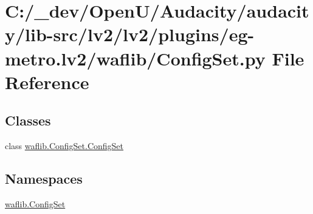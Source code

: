 \hypertarget{lv2_2plugins_2eg-metro_8lv2_2waflib_2_config_set_8py}{}\section{C\+:/\+\_\+dev/\+Open\+U/\+Audacity/audacity/lib-\/src/lv2/lv2/plugins/eg-\/metro.lv2/waflib/\+Config\+Set.py File Reference}
\label{lv2_2plugins_2eg-metro_8lv2_2waflib_2_config_set_8py}
\subsection*{Classes}
\begin{DoxyCompactItemize}
\item 
class \hyperlink{classwaflib_1_1_config_set_1_1_config_set}{waflib.\+Config\+Set.\+Config\+Set}
\end{DoxyCompactItemize}
\subsection*{Namespaces}
\begin{DoxyCompactItemize}
\item 
 \hyperlink{namespacewaflib_1_1_config_set}{waflib.\+Config\+Set}
\end{DoxyCompactItemize}
